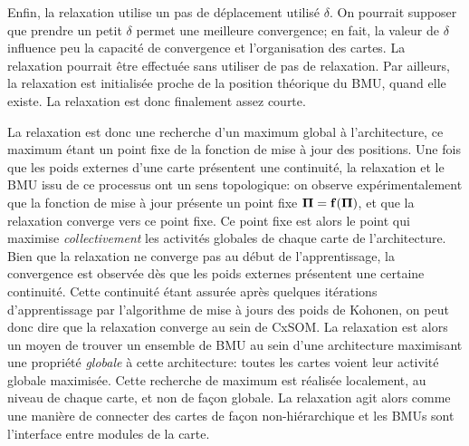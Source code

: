 \documentclass[../main]{subfiles}
\begin{document}
Enfin, la relaxation utilise un pas de déplacement utilisé $\delta$. 
On pourrait supposer que prendre un petit $\delta$ permet une meilleure convergence; en fait, la valeur de $\delta$ influence peu la capacité de convergence et l'organisation des cartes. La relaxation pourrait être effectuée sans utiliser de pas de relaxation. Par ailleurs, la relaxation est initialisée proche de la position théorique du BMU, quand elle existe. La relaxation est donc finalement assez courte.

La relaxation est donc une recherche d'un maximum global à l'architecture, ce maximum étant un point fixe de la fonction de mise à jour des positions.
Une fois que les poids externes d'une carte présentent une continuité, la relaxation et le BMU issu de ce processus ont un sens topologique: on observe expérimentalement que la fonction de mise à jour présente un point fixe $\mathbf{\Pi} = \mathbf{f}(\mathbf{\Pi})$, et que la relaxation converge vers ce point fixe. Ce point fixe est alors le point qui maximise \emph{collectivement} les activités globales de chaque carte de l'architecture.
Bien que la relaxation ne converge pas au début de l'apprentissage, la convergence est observée dès que les poids externes présentent une certaine continuité. Cette continuité étant assurée après quelques itérations d'apprentissage par l'algorithme de mise à jours des poids de Kohonen, on peut donc dire que la relaxation converge au sein de CxSOM.
La relaxation est alors un moyen de trouver un ensemble de BMU au sein d'une architecture maximisant une propriété \emph{globale} à cette architecture: toutes les cartes voient leur activité globale maximisée. 
Cette recherche de maximum est réalisée localement, au niveau de chaque carte, et non de façon globale. La relaxation agit alors comme une manière de connecter des cartes de façon non-hiérarchique et les BMUs sont l'interface entre modules de la carte.

\end{document}
